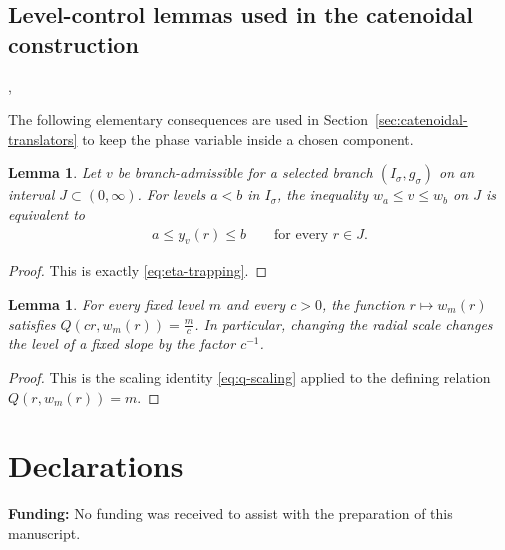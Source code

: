 \documentclass{amsart}
\theoremstyle{plain}
\newtheorem{lemma}[theorem]{Lemma}
\theoremstyle{mainintrothm}
\theoremstyle{definition}
\begin{document}
\subsection{Level-control lemmas used in the catenoidal construction},
\label{subsec:appendix-catenoidal-level-control}

The following elementary consequences are used in
Section~\ref{sec:catenoidal-translators} to keep the phase variable inside a
chosen component.

\begin{lemma}
	\label{lem:level-control-upper-entry}
	Let $v$ be branch-admissible for a selected branch $(I_\sigma,g_\sigma)$ on
	an interval $J\subset(0,\infty)$.  For levels $a<b$ in $I_\sigma$, the
	inequality $w_a\le v\le w_b$ on $J$ is equivalent to
	\begin{align*}
		a\le y_v(r)\le b
		\qquad
		\text{for every }r\in J.
	\end{align*}
\end{lemma}

\begin{proof}
	This is exactly \eqref{eq:eta-trapping}.
\end{proof}

\begin{lemma}
	\label{lem:level-function-scaling}
	For every fixed level $m$ and every $c>0$, the function $r\mapsto w_m(r)$
	satisfies $Q(cr,w_m(r))=\frac{m}{c}$.  In particular, changing the radial scale
	changes the level of a fixed slope by the factor $c^{-1}$.
\end{lemma}

\begin{proof}
	This is the scaling identity \eqref{eq:q-scaling} applied to the defining
	relation $Q(r,w_m(r))=m$.
\end{proof}

\section*{Declarations}
\textbf{Funding:}
No funding was received to assist with the preparation of this manuscript.
\end{document}
